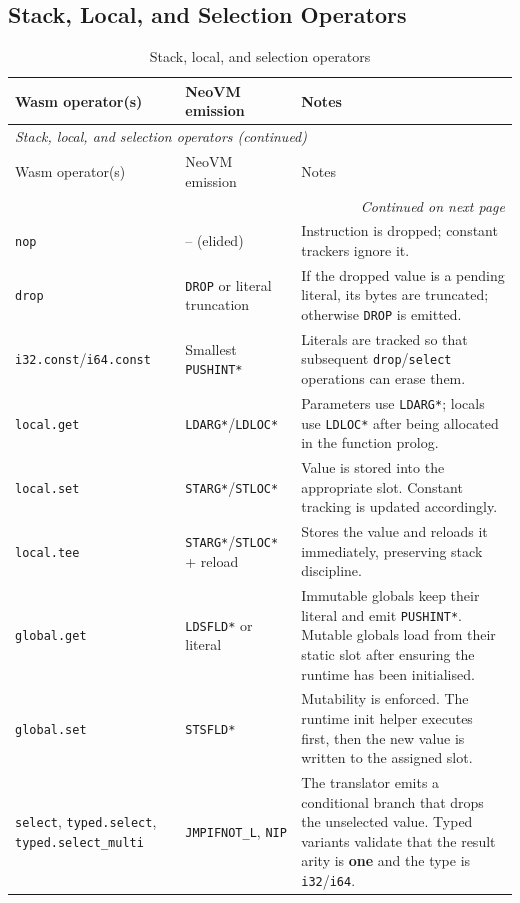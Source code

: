 \documentclass[11pt]{article}
\begin{document}
\subsection{Stack, Local, and Selection Operators}
\begin{longtable}{@{}p{4.7cm}p{3.8cm}p{6.5cm}@{}}
\caption{Stack, local, and selection operators}\\
\toprule
Wasm operator(s) & NeoVM emission & Notes \\
\midrule
\endfirsthead
\multicolumn{3}{l}{\textit{Stack, local, and selection operators (continued)}}\\
\toprule
Wasm operator(s) & NeoVM emission & Notes \\
\midrule
\endhead
\midrule
\multicolumn{3}{r}{\textit{Continued on next page}}\\
\bottomrule
\endfoot
\bottomrule
\endlastfoot
\texttt{nop} & -- (elided) & Instruction is dropped; constant trackers ignore it.
\tabularnewline
\texttt{drop} & \texttt{DROP} or literal truncation & If the dropped value is a pending literal, its bytes are truncated; otherwise \texttt{DROP} is emitted.
\tabularnewline
\texttt{i32.const}/\texttt{i64.const} & Smallest \texttt{PUSHINT*} & Literals are tracked so that subsequent \texttt{drop}/\texttt{select} operations can erase them.
\tabularnewline
\texttt{local.get} & \texttt{LDARG*}/\texttt{LDLOC*} & Parameters use \texttt{LDARG*}; locals use \texttt{LDLOC*} after being allocated in the function prolog.
\tabularnewline
\texttt{local.set} & \texttt{STARG*}/\texttt{STLOC*} & Value is stored into the appropriate slot. Constant tracking is updated accordingly.
\tabularnewline
\texttt{local.tee} & \texttt{STARG*}/\texttt{STLOC*} + reload & Stores the value and reloads it immediately, preserving stack discipline.
\tabularnewline
\texttt{global.get} & \texttt{LDSFLD*} or literal & Immutable globals keep their literal and emit \texttt{PUSHINT*}. Mutable globals load from their static slot after ensuring the runtime has been initialised.
\tabularnewline
\texttt{global.set} & \texttt{STSFLD*} & Mutability is enforced. The runtime init helper executes first, then the new value is written to the assigned slot.
\tabularnewline
\texttt{select}, \texttt{typed.select}, \texttt{typed.select\_multi} & \texttt{JMPIFNOT\_L}, \texttt{NIP} & The translator emits a conditional branch that drops the unselected value. Typed variants validate that the result arity is \textbf{one} and the type is \texttt{i32}/\texttt{i64}.
\tabularnewline
\end{longtable}
\end{document}
